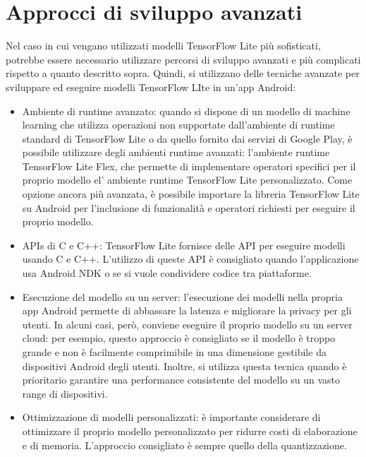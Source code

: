 \section{Approcci di sviluppo avanzati}
Nel caso in cui vengano utilizzati modelli TensorFlow Lite più sofisticati, potrebbe essere necessario utilizzare percorsi di sviluppo avanzati e più complicati rispetto a quanto descritto sopra. Quindi,
si utilizzano delle tecniche avanzate per sviluppare ed eseguire modelli TensorFlow LIte in un’app Android:
\begin{itemize}
    \item Ambiente di runtime avanzato: quando si dispone di un modello di machine learning che utilizza operazioni non supportate dall’ambiente di runtime standard di TensorFlow Lite o da quello fornito dai servizi di Google Play,
    è possibile utilizzare degli ambienti runtime avanzati: l’ambiente runtime TensorFlow Lite Flex, che permette di implementare operatori specifici per il proprio modello el’ ambiente runtime TensorFlow Lite personalizzato.
    Come opzione ancora più avanzata, è possibile importare la libreria TensorFlow Lite su Android per l’inclusione di funzionalità e operatori richiesti per eseguire il proprio modello.
    \item APIs di C e C++: TensorFlow Lite fornisce delle API per eseguire modelli usando C e C++. L’utilizzo di queste API è consigliato quando l’applicazione usa Android NDK o se si vuole condividere codice tra piattaforme.
    \item Esecuzione del modello su un server: l’esecuzione dei modelli nella propria app Android permette di abbassare la latenza e migliorare la privacy per gli utenti. In alcuni casi, però, conviene eseguire il proprio modello
    su un server cloud: per esempio, questo approccio è consigliato se il modello è troppo grande e non è facilmente comprimibile in una dimensione gestibile da dispositivi Android degli utenti. Inoltre, si utilizza questa tecnica
    quando è prioritario garantire una performance consistente del modello su un vasto range di dispositivi.
    \item Ottimizzazione di modelli personalizzati: è importante considerare di ottimizzare il proprio modello personalizzato per ridurre costi di elaborazione e di memoria. L’approccio consigliato è sempre quello della quantizzazione. 
\end{itemize}